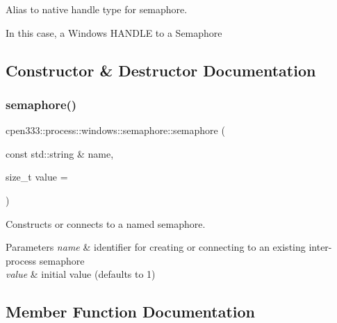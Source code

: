 Alias to native handle type for semaphore. 

In this case, a Windows H\+A\+N\+D\+LE to a Semaphore 

\subsection{Constructor \& Destructor Documentation}
\mbox{\label{classcpen333_1_1process_1_1windows_1_1semaphore_a1bd71d0b00c26143be3187c18ec6865a}} 
\subsubsection{\texorpdfstring{semaphore()}{semaphore()}}
{\footnotesize\ttfamily cpen333\+::process\+::windows\+::semaphore\+::semaphore (\begin{DoxyParamCaption}\item[{const std\+::string \&}]{name,  }\item[{size\+\_\+t}]{value = {} }\end{DoxyParamCaption})\hspace{0.3cm}{\ttfamily [inline]}}



Constructs or connects to a named semaphore. 


\begin{DoxyParams}{Parameters}
{\em name} & identifier for creating or connecting to an existing inter-\/process semaphore \\
\hline
{\em value} & initial value (defaults to 1) \\
\hline
\end{DoxyParams}


\subsection{Member Function Documentation}
\mbox{\label{classcpen333_1_1process_1_1windows_1_1semaphore_ae73fa406be3b0df603b260e892c94081}} 
